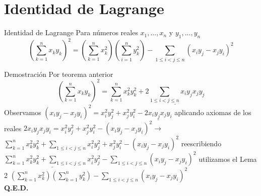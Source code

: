 \section{Identidad de Lagrange}

\begin{frame}{Identidad de Lagrange}
Para números reales $x_{1},...,x_{n}$ y $y_{1},...,y_{n}$
\begin{equation*}
    (\sum_{k=1}^{n}x_{k}y_{k})^{2} = (\sum_{k=1}^{n} x^{2}_{k})(\sum_{i=1}^{n}y^{2}_{k})-\sum_{1\leq i<j \leq n}(x_{i}y_{j}-x_{j}y_{i})^{2}
\end{equation*}
    
\end{frame}
\begin{frame}{Demostración}
Por teorema anterior 
\begin{equation*}
    (\sum_{k=1}^{n}x_{k}y_{k})^{2} =  \sum_{k=1}^{n} x^{2}_{k}y^{2}_{k} +\underline{ 2 \sum_{1 \leq i < j \leq n} x_{i}y_{j}x_{j}y_{j}}
\end{equation*}
Observamos $(x_{i}y_{j} - x_{j}y_{i})^{2} = x^{2}_{i}y^{2}_{j}+x^{2}_{j}y^{2}_{i}-\underline{2x_{i}y_{j}x_{j}y_{i}}$ aplicando axiomas de los reales 
$2x_{i}y_{j}x_{j}y_{i} = x^{2}_{i}y^{2}_{j}+x^{2}_{j}y^{2}_{i} - (x_{i}y_{j} - x_{j}y_{i})^{2} \to $
$ \sum_{k=1}^{n} x^{2}_{k}y^{2}_{k} + \sum_{1 \leq i < j \leq n}  x^{2}_{i}y^{2}_{j}+x^{2}_{j}y^{2}_{i} - (x_{i}y_{j} - x_{j}y_{i})^{2} $ reescribiendo $\underline{ \sum_{k=1}^{n} x^{2}_{k}y^{2}_{k} +  \sum_{1 \leq i < j \leq n} x^{2}_{i}y^{2}_{j}} -  \sum_{1 \leq i < j \leq n} (x_{i}y_{j} - x_{j}y_{i})^{2} $ utilizamos el Lema 2 $(\sum_{k=1}^{n} x^{2}_{k})(\sum_{k=1}^{n} y^{2}_{k}) -  \sum_{1 \leq i < j \leq n} (x_{i}y_{j} - x_{j}y_{i})^{2}$ \\ 
\textbf{Q.E.D.}
\end{frame}